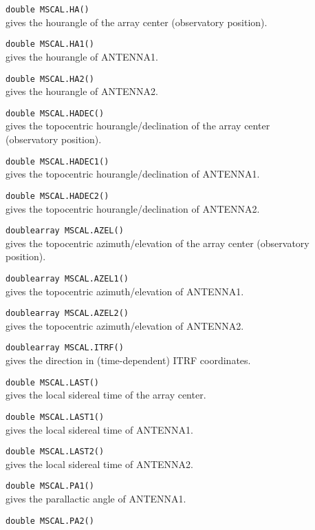 \begin{description}
  \item[] \texttt{double MSCAL.HA()}\\
    gives the hourangle of the array center (observatory position).
  \item[] \texttt{double MSCAL.HA1()}\\
    gives the hourangle of ANTENNA1.
  \item[] \texttt{double MSCAL.HA2()}\\
    gives the hourangle of ANTENNA2.
  \item[] \texttt{double MSCAL.HADEC()}\\
    gives the topocentric hourangle/declination of the array center (observatory position).
  \item[] \texttt{double MSCAL.HADEC1()}\\
    gives the topocentric hourangle/declination of ANTENNA1.
  \item[] \texttt{double MSCAL.HADEC2()}\\
    gives the topocentric hourangle/declination of ANTENNA2.
  \item[] \texttt{doublearray MSCAL.AZEL()}\\
    gives the topocentric azimuth/elevation of the array center (observatory position).
  \item[] \texttt{doublearray MSCAL.AZEL1()}\\
    gives the topocentric azimuth/elevation of ANTENNA1.
  \item[] \texttt{doublearray MSCAL.AZEL2()}\\
    gives the topocentric azimuth/elevation of ANTENNA2.
  \item[] \texttt{doublearray MSCAL.ITRF()}\\
    gives the direction in (time-dependent) ITRF coordinates.
  \item[] \texttt{double MSCAL.LAST()}\\
    gives the local sidereal time of the array center.
  \item[] \texttt{double MSCAL.LAST1()}\\
    gives the local sidereal time of ANTENNA1.
  \item[] \texttt{double MSCAL.LAST2()}\\
    gives the local sidereal time of ANTENNA2.
  \item[] \texttt{double MSCAL.PA1()}\\
    gives the parallactic angle of ANTENNA1.
  \item[] \texttt{double MSCAL.PA2()}\\

\end{description}
